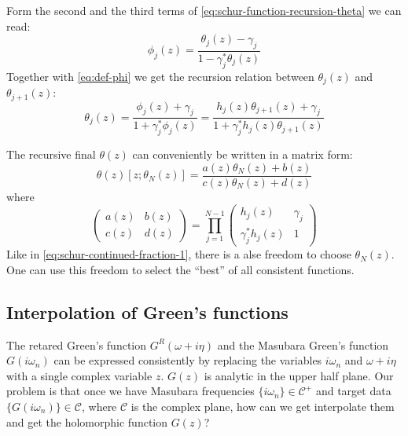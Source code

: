\documentclass[
	preprint,%
	aps,
	prb,
	showpacs,	
	amsmath, amssymb]{revtex4-2}
\DeclareRobustCommand{\+}{\hstretch{1.25} {\boldsymbol {\mathrel{+}}}}
\newcommand{\C}{ {\mathcal{C}} }
\begin{document}
Form the second and the third terms of \cref{eq:schur-function-recursion-theta}
we can read:
\begin{equation}\label{eq:phi-theta-j}
	\phi_j(z)
	= \frac{\theta_j(z) - \gamma_j}{1 - \gamma_j^* \theta_j(z)}
\end{equation}
Together with \cref{eq:def-phi} we get the recursion relation between 
$\theta_j(z)$ and $\theta_{j+1}(z)$:
\begin{equation}\label{eq:recursion-relation-theta}
	\theta_j(z) = \frac{\phi_j(z) + \gamma_j}{1 + \gamma_j^*\phi_j(z)}
		= \frac{h_j(z) \theta_{j+1}(z)  + \gamma_j}
			{1 + \gamma_j^*h_j(z) \theta_{j+1}(z) }
\end{equation}

The recursive final $\theta(z)$ can conveniently be written in a
matrix form:
\begin{equation}\label{eq:recursive-theta}
	\theta(z)[z;\theta_N(z)] 
		= \frac{a(z)\theta_N(z) + b(z)}{c(z)\theta_N(z) + d(z)}
\end{equation}
where
\begin{equation}\label{eq:factor-matrix}
	\left(
		\begin{matrix}
			a(z) & b(z) \\
			c(z) & d(z)
		\end{matrix}
	\right) = \prod_{j=1}^{N-1}
	\left(
		\begin{matrix}
			h_j(z)            & \gamma_j \\
			\gamma_j^* h_j(z) & 1
		\end{matrix}
	\right)
\end{equation}
Like in \cref{eq:schur-continued-fraction-1}, 
there is a alse freedom to choose $\theta_N(z)$.
One can use this freedom to select the “best” of 
all consistent functions.

\subsection{Interpolation of Green's functions}
\label{subsec:interpolation-of-GF}

The retared Green's function $G^R(\omega + i\eta)$ and the Masubara 
Green's function $G(i\omega_n)$ can be expressed consistently by replacing 
the variables $i\omega_n$ and $\omega + i\eta$ with a single complex 
variable $z$. $G(z)$ is analytic in the upper half plane. 
Our problem is that once we have Masubara frequencies $\{i\omega_n\} \in \C^+$ 
and target data $\{ G(i\omega_n)\} \in \C$, where $\C$ is 
the complex plane, how can we get interpolate them and get the 
holomorphic function $G(z)$?
\end{document}
